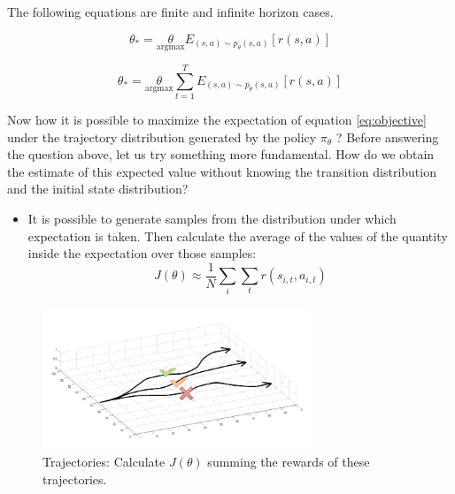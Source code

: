 \documentclass[]{article}
\begin{document}
\par The following equations are finite and infinite horizon cases. 

\begin{equation}
    \theta_{*} = \underset{\text{argmax}}{\theta} E_{(s,a) \sim p_{\theta}(s,a)} [r(s,a)] 
\end{equation}

\begin{equation}
    \theta_{*} = \underset{\text{argmax}}{\theta} \sum_{t=1}^{T}E_{(s,a) \sim p_{\theta}(s,a)} [r(s,a)]
\end{equation}

Now how it is possible to maximize the expectation of equation \eqref{eq:objective} under the trajectory distribution generated by the
policy $\pi_{\theta}$ ? Before answering the question above, let us try something more fundamental. How do we obtain the
estimate of this expected value without knowing the transition distribution and the initial state distribution? 
\begin{itemize}
    \item It is possible to generate samples from the distribution under which expectation is taken. Then
        calculate the average of the values of the quantity inside the expectation over those samples:
    \begin{equation}
        \label{eq:samples1}
        J(\theta) \approx \frac{1}{N} \sum_{i} \sum_{t} r(s_{i,t},a_{i,t})
    \end{equation}
\end{itemize}

\begin{figure}
\begin{center}
    \includegraphics[scale=0.5]{cap4img/trajectories.png}
\end{center}
\caption{Trajectories: Calculate $J(\theta) $ summing the rewards of these trajectories.}
\label{fig:trajectories}
\end{figure}
\end{document}
